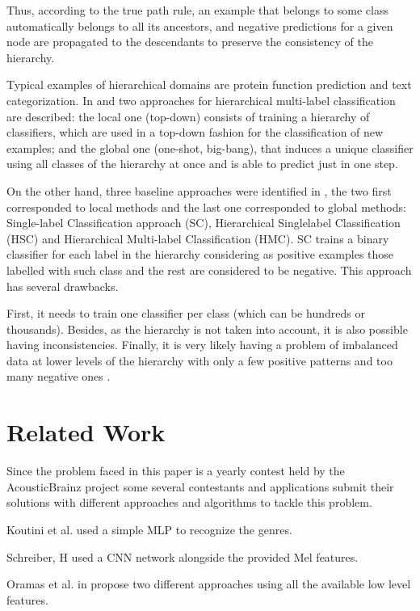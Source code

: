 Thus, according to the true path rule, an example that belongs to some class automatically belongs to all its ancestors,
and negative predictions for a given node are propagated to the descendants to
preserve the consistency of the hierarchy. 

Typical examples of hierarchical domains
are protein function prediction and text categorization.
In \cite{Cerri2012} and \cite{Silla2011} two approaches for hierarchical multi-label classification are
described: the local one (top-down) consists of training a hierarchy of classifiers, which are used in a top-down fashion for the classification of new examples; and the global one (one-shot, big-bang), that induces
a unique classifier using all classes of the hierarchy at once and is able to predict just in one step. 

On the other hand, three baseline approaches were identified in \cite{Vens2008}, the two first corresponded to local methods and the last one corresponded
to global methods: Single-label Classification approach (SC), Hierarchical Singlelabel Classification (HSC) and Hierarchical Multi-label Classification (HMC).
SC trains a binary classifier for each label in the hierarchy considering as
positive examples those labelled with such class and the rest are considered to be
negative. This approach has several drawbacks. 

First, it needs to train one classifier per class (which can be hundreds or thousands). 
Besides, as the hierarchy is not taken into account, it is also possible having inconsistencies. 
Finally, it is very likely having a problem of imbalanced data at lower levels of the hierarchy with only a few positive patterns and too many negative ones \cite{Gibaja2014}.



\section{Related Work}

Since the problem faced in this paper is a yearly contest held by the AcousticBrainz project \cite{genretask} 
some several contestants and applications submit their solutions with different approaches and algorithms to tackle this problem.

Koutini et al. \cite{koutinimediaeval} used a simple MLP to recognize the genres.

Schreiber, H \cite{schreiber2018mediaeval} used a CNN network alongside the provided Mel features.

Oramas et al. in \cite{oramas2018mediaeval} propose two different approaches using all the available low level features.

